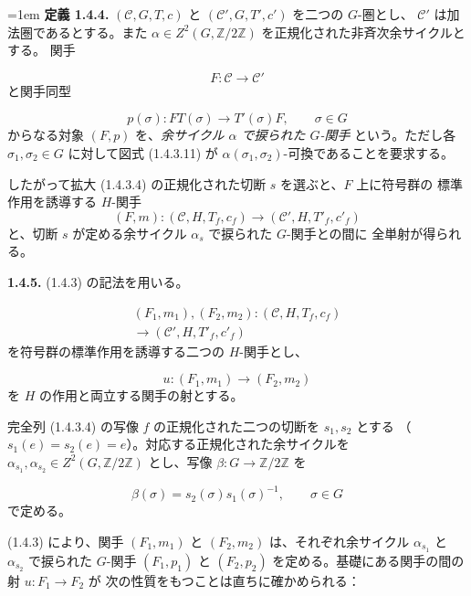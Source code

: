 \clearpage
{}%
\begingroup
\emergencystretch=1em
\noindent\textbf{定義 1.4.4.}\quad
$(\mathcal C,G,T,c)$ と $(\mathcal C',G,T',c')$ を二つの $G$-圏とし、
$\mathcal C'$ は加法圏であるとする。また
$\alpha\in Z^2(G,\mathbb Z/2\mathbb Z)$ を正規化された非斉次余サイクルとする。
関手

\[
  F\colon\mathcal C\longrightarrow\mathcal C'
\]
と関手同型

\[
  p(\sigma)\colon FT(\sigma)\longrightarrow T'(\sigma)F,
  \qquad \sigma\in G
\]
からなる対象 $(F,p)$ を、\emph{余サイクル $\alpha$ で捩られた $G$-関手}
という。ただし各 $\sigma_1,\sigma_2\in G$ に対して図式 (1.4.3.11) が
$\alpha(\sigma_1,\sigma_2)$-可換であることを要求する。
\par
\endgroup

したがって拡大 (1.4.3.4) の正規化された切断 $s$ を選ぶと、$F$ 上に符号群の
標準作用を誘導する $H$-関手
\[
  (F,m)\colon(\mathcal C,H,T_f,c_f)
  \longrightarrow(\mathcal C',H,T'_f,c'_f)
\]
と、切断 $s$ が定める余サイクル $\alpha_s$ で捩られた $G$-関手との間に
全単射が得られる。

\noindent\textbf{1.4.5.}\quad
(1.4.3) の記法を用いる。

\begin{equation}
  \begin{gathered}
    (F_1,m_1),(F_2,m_2)\colon
    (\mathcal C,H,T_f,c_f)\\[-0.2em]
    \longrightarrow(\mathcal C',H,T'_f,c'_f)
  \end{gathered}
  \tag{1.4.5.1}
\end{equation}
を符号群の標準作用を誘導する二つの $H$-関手とし、

\begin{equation}
  u\colon(F_1,m_1)\longrightarrow(F_2,m_2)
  \tag{1.4.5.2}
\end{equation}
を $H$ の作用と両立する関手の射とする。

完全列 (1.4.3.4) の写像 $f$ の正規化された二つの切断を $s_1,s_2$ とする
（$s_1(e)=s_2(e)=e$）。対応する正規化された余サイクルを
$\alpha_{s_1},\alpha_{s_2}\in Z^2(G,\mathbb Z/2\mathbb Z)$ とし、写像
$\beta\colon G\to\mathbb Z/2\mathbb Z$ を

\begin{equation}
  \beta(\sigma)=s_2(\sigma)s_1(\sigma)^{-1},
  \qquad \sigma\in G
  \tag{1.4.5.3}
\end{equation}
で定める。

(1.4.3) により、関手 $(F_1,m_1)$ と $(F_2,m_2)$ は、それぞれ余サイクル
$\alpha_{s_1}$ と $\alpha_{s_2}$ で捩られた $G$-関手 $(F_1,p_1)$ と
$(F_2,p_2)$ を定める。基礎にある関手の間の射 $u\colon F_1\to F_2$ が
次の性質をもつことは直ちに確かめられる：

